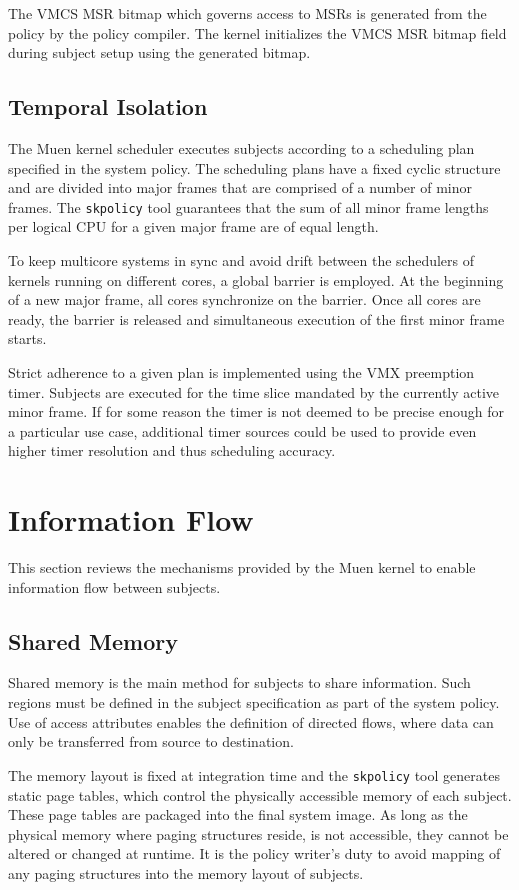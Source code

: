 The VMCS MSR bitmap which governs access to MSRs is generated from the policy by
the policy compiler. The kernel initializes the VMCS MSR bitmap field during
subject setup using the generated bitmap.

\subsection{Temporal Isolation}\label{subsec:temp-isolation}
The Muen kernel scheduler executes subjects according to a scheduling plan
specified in the system policy. The scheduling plans have a fixed cyclic
structure and are divided into major frames that are comprised of a number of
minor frames. The \texttt{skpolicy} tool guarantees that the sum of all minor
frame lengths per logical CPU for a given major frame are of equal length.

To keep multicore systems in sync and avoid drift between the schedulers of
kernels running on different cores, a global barrier is employed. At the
beginning of a new major frame, all cores synchronize on the barrier. Once all
cores are ready, the barrier is released and simultaneous execution of the
first minor frame starts.

Strict adherence to a given plan is implemented using the VMX preemption timer.
Subjects are executed for the time slice mandated by the currently active minor
frame. If for some reason the timer is not deemed to be precise enough for a
particular use case, additional timer sources could be used to provide even
higher timer resolution and thus scheduling accuracy.

\section{Information Flow}\label{sec:information-flow}
This section reviews the mechanisms provided by the Muen kernel to enable
information flow between subjects.

\subsection{Shared Memory}
Shared memory is the main method for subjects to share information. Such regions
must be defined in the subject specification as part of the system policy. Use of
access attributes enables the definition of directed flows, where data can only
be transferred from source to destination.

The memory layout is fixed at integration time and the \texttt{skpolicy} tool
generates static page tables, which control the physically accessible memory of
each subject. These page tables are packaged into the final system image. As
long as the physical memory where paging structures reside, is not accessible,
they cannot be altered or changed at runtime. It is the policy writer's duty to
avoid mapping of any paging structures into the memory layout of subjects.

